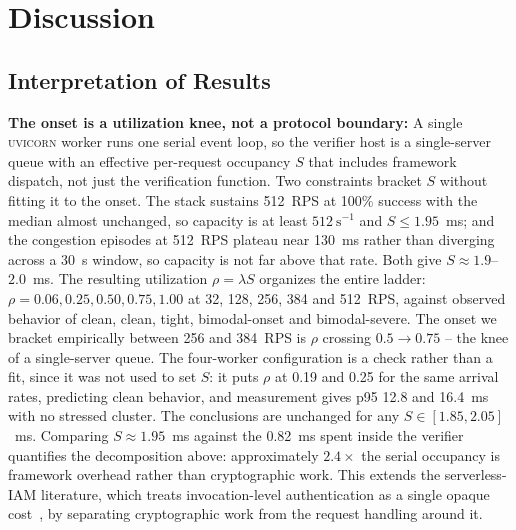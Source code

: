 \documentclass[conference]{IEEEtran}
\begin{document}
\section{Discussion}
\label{sec:discussion}

\subsection{Interpretation of Results}
\label{subsec:interpret}

\textbf{The onset is a utilization knee, not a protocol boundary:}
A single \textsc{uvicorn} worker runs one serial event loop, so the verifier host is a single-server queue with an effective per-request occupancy $S$ that includes framework dispatch, not just the verification function. Two constraints bracket $S$ without fitting it to the onset. The stack sustains 512~RPS at 100\% success with the median almost unchanged, so capacity is at least $512~\mathrm{s}^{-1}$ and $S \le 1.95$~ms; and the congestion episodes at 512~RPS plateau near 130~ms rather than diverging across a 30~s window, so capacity is not far above that rate. Both give $S \approx 1.9$--$2.0$~ms. The resulting utilization $\rho = \lambda S$ organizes the entire ladder: $\rho = 0.06, 0.25, 0.50, 0.75, 1.00$ at 32, 128, 256, 384 and 512~RPS, against observed behavior of clean, clean, tight, bimodal-onset and bimodal-severe. The onset we bracket empirically between 256 and 384~RPS is $\rho$ crossing $0.5 \to 0.75$ -- the knee of a single-server queue. The four-worker configuration is a check rather than a fit, since it was not used to set $S$: it puts $\rho$ at 0.19 and 0.25 for the same arrival rates, predicting clean behavior, and measurement gives p95 12.8 and 16.4~ms with no stressed cluster. The conclusions are unchanged for any $S \in [1.85, 2.05]$~ms. Comparing $S \approx 1.95$~ms against the 0.82~ms spent inside the verifier quantifies the decomposition above: approximately $2.4\times$ the serial occupancy is framework overhead rather than cryptographic work. This extends the serverless-IAM literature, which treats invocation-level authentication as a single opaque cost~\cite{sankaran2020,marin2022serverless}, by separating cryptographic work from the request handling around it.
\end{document}
